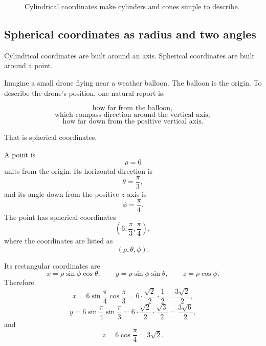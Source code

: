 \begin{figure}[h]
\caption{Cylindrical coordinates make cylinders and cones simple to describe.}
\end{figure}

\subsection{Spherical coordinates as radius and two angles}

Cylindrical coordinates are built around an axis.  Spherical coordinates are built around
a point.

Imagine a small drone flying near a weather balloon.  The balloon is the origin.  To
describe the drone's position, one natural report is:

\[
    \text{how far from the balloon},
\]
\[
    \text{which compass direction around the vertical axis},
\]
\[
    \text{how far down from the positive vertical axis}.
\]

That is spherical coordinates.

\begin{example}
A point is
\[
    \rho=6
\]
units from the origin.  Its horizontal direction is
\[
    \theta=\frac{\pi}{3},
\]
and its angle down from the positive \(z\)-axis is
\[
    \phi=\frac{\pi}{4}.
\]
The point has spherical coordinates
\[
    \left(6,\frac{\pi}{3},\frac{\pi}{4}\right),
\]
where the coordinates are listed as
\[
    (\rho,\theta,\phi).
\]

Its rectangular coordinates are
\[
    x=\rho\sin\phi\cos\theta,
    \qquad
    y=\rho\sin\phi\sin\theta,
    \qquad
    z=\rho\cos\phi.
\]
Therefore
\[
    x=6\sin\frac{\pi}{4}\cos\frac{\pi}{3}
    =
    6\cdot\frac{\sqrt2}{2}\cdot\frac12
    =
    \frac{3\sqrt2}{2},
\]
\[
    y=6\sin\frac{\pi}{4}\sin\frac{\pi}{3}
    =
    6\cdot\frac{\sqrt2}{2}\cdot\frac{\sqrt3}{2}
    =
    \frac{3\sqrt6}{2},
\]
and
\[
    z=6\cos\frac{\pi}{4}
    =
    3\sqrt2.
\]
\end{example}

